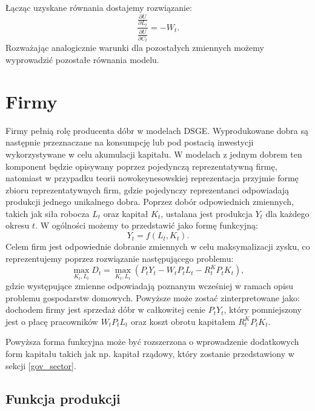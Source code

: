 Łącząc uzyskane równania dostajemy rozwiązanie:
\begin{equation}
    \frac{\frac{\partial U}{\partial L_t}}{\frac{\partial U}{\partial C_t}} = -W_t.
\end{equation}
Rozważając analogicznie warunki dla pozostałych zmiennych możemy wyprowadzić pozostałe równania modelu.

\section{Firmy}
\label{sec:firms}

Firmy pełnią rolę producenta dóbr w modelach DSGE. Wyprodukowane dobra są następnie przeznaczane na konsumpcję lub pod postacią inwestycji wykorzystywane w celu akumulacji kapitału. W modelach z jednym dobrem ten komponent będzie opisywany poprzez pojedynczą reprezentatywną firmę, natomiast w przypadku teorii nowokeynesowskiej reprezentacja przyjmie formę zbioru reprezentatywnych firm, gdzie pojedynczy reprezentanci odpowiadają produkcji jednego unikalnego dobra. Poprzez dobór odpowiednich zmiennych, takich jak siła robocza $L_t$ oraz kapitał $K_t$, ustalana jest produkcja $Y_t$ dla każdego okresu $t$. W ogólności możemy to przedstawić jako formę funkcyjną:
\begin{equation}
    Y_t = f(L_t, K_t).
\end{equation}
Celem firm jest odpowiednie dobranie zmiennych w celu maksymalizacji zysku, co reprezentujemy poprzez rozwiązanie następującego problemu:
\begin{equation}
\label{eqn:firmProblem}
    \max\limits_{K_t, L_t} D_t = \max\limits_{K_t, L_t} \left(P_t Y_t - W_t P_t L_t - R^K_t P_t K_t\right),
\end{equation}
gdzie występujące zmienne odpowiadają poznanym wcześniej w ramach opisu problemu gospodarstw domowych. Powyższe może zostać zinterpretowane jako: dochodem firmy jest sprzedaż dóbr w całkowitej cenie $P_t Y_t$, który pomniejszony jest o płacę pracowników $W_t P_t L_t$ oraz koszt obrotu kapitałem $R^K_t P_t K_t$.

Powyższa forma funkcyjna może być rozszerzona o wprowadzenie dodatkowych form kapitału takich jak np. kapitał rządowy, który zostanie przedstawiony w sekcji \ref{gov_sector}.

\subsection{Funkcja produkcji}

